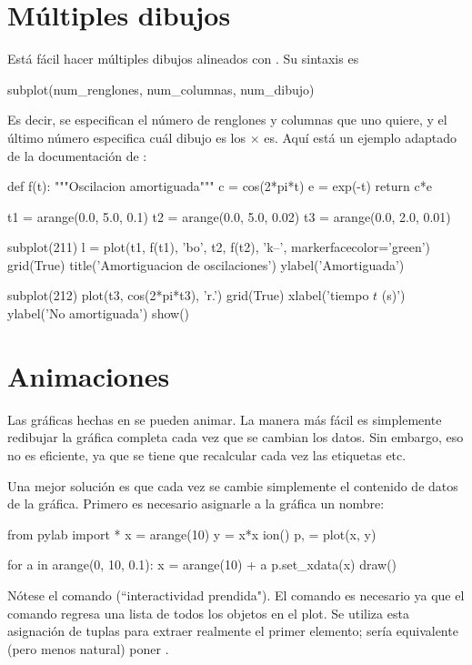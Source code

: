 \section{Múltiples dibujos}
Está fácil hacer múltiples dibujos alineados con . Su sintaxis es
\begin{python}
subplot(num_renglones, num_columnas, num_dibujo)
\end{python}
Es decir, se especifican el número de renglones y columnas que uno quiere, y el último número especifica cuál dibujo es los  $\times$  es. Aquí está un ejemplo adaptado de la documentación de :
\begin{python}
def f(t):
  """Oscilacion amortiguada"""
  c = cos(2*pi*t)
  e = exp(-t)
  return c*e

t1 = arange(0.0, 5.0, 0.1)
t2 = arange(0.0, 5.0, 0.02)
t3 = arange(0.0, 2.0, 0.01)

subplot(211)
l = plot(t1, f(t1), 'bo', t2, f(t2), 'k--', markerfacecolor='green')
grid(True)
title('Amortiguacion de oscilaciones')
ylabel('Amortiguada')

subplot(212)
plot(t3, cos(2*pi*t3), 'r.')
grid(True)
xlabel('tiempo $t$ (s)')
ylabel('No amortiguada')
show()
\end{python}

\section{Animaciones}
Las gráficas hechas en  se pueden animar. La manera más fácil es simplemente redibujar la gráfica completa cada vez que se cambian los datos. Sin embargo, eso no es eficiente, ya que se tiene que recalcular cada vez las etiquetas etc.

Una mejor solución es que cada vez se cambie simplemente el contenido de datos de la gráfica. Primero es necesario asignarle a la gráfica un nombre:
\begin{python}
from pylab import *
x = arange(10)
y = x*x
ion()
p, = plot(x, y)

for a in arange(0, 10, 0.1):
  x = arange(10) + a
  p.set_xdata(x)
  draw()
\end{python}
Nótese el comando  (``interactividad prendida").
El comando  es necesario ya que el comando  regresa una lista de todos los objetos en el plot. Se utiliza esta asignación de tuplas para extraer realmente el primer elemento; sería equivalente (pero menos natural) poner .


